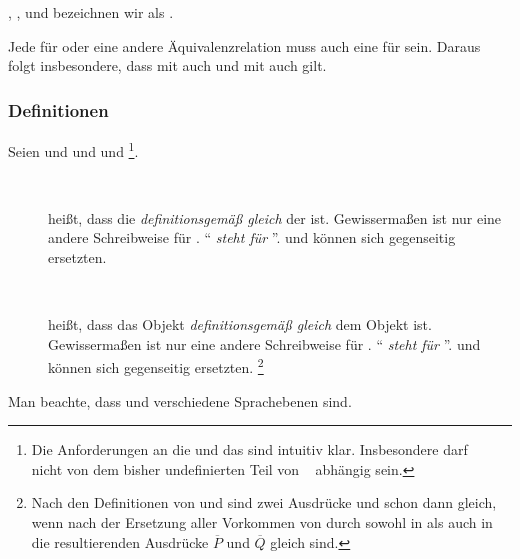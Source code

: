 \objqt{=}, \objqt{\ne}, \objqt{\equiv} und \objqt{\nequiv} bezeichnen wir als  \emph{}.

Jede  für \objqt{\equiv} oder eine andere Äquivalenzrelation muss auch eine für \objqt{\eq} sein.
Daraus folgt insbesondere, dass mit  auch  und mit  auch  gilt.

\subsubsection{Definitionen}%
\label{subsub:Definitionen}

{
	\newcommand{\A}{\overline{A}}
	\newcommand{\B}{\overline{B}}
	Seien \objqt{\A} und \objqt{\B}  und  und  \footnote{%
		Die Anforderungen an die  \objqt{\A} und das   sind intuitiv klar.
		Insbesondere darf \objqt{\B} \textbzw\  nicht von dem bisher undefinierten Teil von \objqt{\A} \textbzw\  abhängig sein.%
	}.
	\begin{description}
		\item[~\emph{}]\label{def:Metadefinition}
		\forqt{\A \metadefeq \B} heißt, dass die  \objqt{\A} \emph{definitionsgemäß gleich} der  \objqt{\B} ist.
		Gewissermaßen ist \objqt{\A} nur eine andere Schreibweise für \objqt{\B}.
		\enquote{\objqt{\A} \emph{steht für} \objqt{\B}}.
		\objqt{\A} und \objqt{\B} können sich gegenseitig ersetzten.
		\item[~\emph{}]\label{def:Definition}
		 heißt, dass das Objekt  \emph{definitionsgemäß gleich} dem Objekt  ist.
		Gewissermaßen ist  nur eine andere Schreibweise für .
		\enquote{ \emph{steht für} }.
		 und  können sich gegenseitig ersetzten.%
		\footnote{%
			Nach den Definitionen von \objqt{\metadefeq} und  sind zwei Ausdrücke  und  schon dann gleich, wenn nach der Ersetzung aller Vorkommen von  durch  sowohl in  als auch in  die resultierenden Ausdrücke $\overline{P}$ und $\overline{Q}$ gleich sind.%
		}

	\end{description}
	Man beachte, dass \objqt{\metadefeq} und  verschiedene Sprachebenen sind.
}

